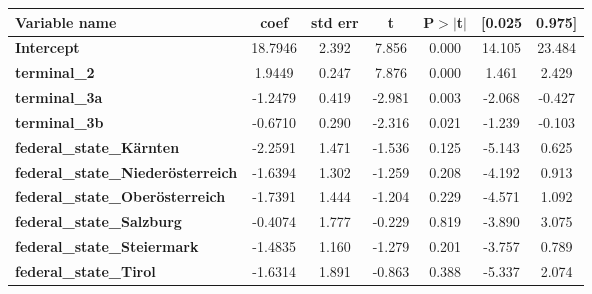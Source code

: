\documentclass[12 pt]{scrartcl}
\numberwithin{equation}{section}
\begin{document}
\begin{table}[htb]
    \begin{center}
        \begin{tabular}{|l||c|c|c|c|cc|}
            \hline
        \textbf{Variable name}                    & \textbf{coef} & \textbf{std err} & \textbf{t} & \textbf{P$> |$t$|$} & \textbf{[0.025} & \textbf{0.975]}  \\ \hline
        
        \textbf{Intercept}                        &      18.7946  &        2.392     &     7.856  &         0.000        &       14.105    &       23.484     \\ \hline
        \textbf{terminal\_2}                      &       1.9449  &        0.247     &     7.876  &         0.000        &        1.461    &        2.429     \\
        \textbf{terminal\_3a}                     &      -1.2479  &        0.419     &    -2.981  &         0.003        &       -2.068    &       -0.427     \\
        \textbf{terminal\_3b}                     &      -0.6710  &        0.290     &    -2.316  &         0.021        &       -1.239    &       -0.103     \\ \hline
        \textbf{federal\_state\_Kärnten}          &      -2.2591  &        1.471     &    -1.536  &         0.125        &       -5.143    &        0.625     \\
        \textbf{federal\_state\_Niederösterreich} &      -1.6394  &        1.302     &    -1.259  &         0.208        &       -4.192    &        0.913     \\
        \textbf{federal\_state\_Oberösterreich}   &      -1.7391  &        1.444     &    -1.204  &         0.229        &       -4.571    &        1.092     \\
        \textbf{federal\_state\_Salzburg}         &      -0.4074  &        1.777     &    -0.229  &         0.819        &       -3.890    &        3.075     \\
        \textbf{federal\_state\_Steiermark}       &      -1.4835  &        1.160     &    -1.279  &         0.201        &       -3.757    &        0.789     \\
        \textbf{federal\_state\_Tirol}            &      -1.6314  &        1.891     &    -0.863  &         0.388        &       -5.337    &        2.074     \\

\end{tabular}
\end{center}
\end{table}
\end{document}
